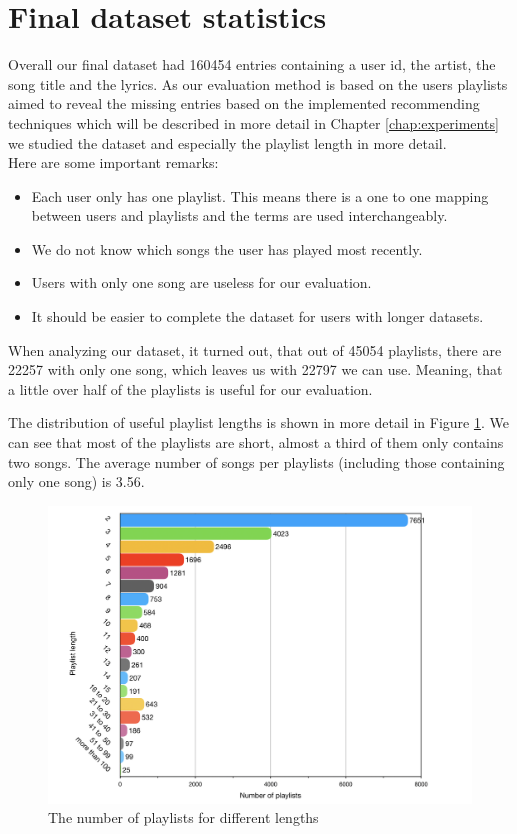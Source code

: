 \section{Final dataset statistics}
Overall our final dataset had 160454 entries containing a user id, the artist, the song title and the lyrics. As our evaluation method is based on the users playlists  aimed to reveal the missing entries based on the implemented recommending techniques which will be described in more detail in Chapter \ref{chap:experiments} we studied the dataset and especially the playlist length in more detail.\\
Here are some important remarks:
\begin{itemize}
    \item Each user only has one playlist. This means there is a one to one mapping between users and playlists and the terms are used interchangeably.
    \item We do not know which songs the user has played most recently.
    \item Users with only one song are useless for our evaluation.
    \item It should be easier to complete the dataset for users with longer datasets.
\end{itemize} 
When analyzing our dataset, it turned out, that out of 45054 playlists, there are 22257 with only one song, which leaves us with 22797 we can use. Meaning, that a little over half of the playlists is useful for our evaluation.

The distribution of useful playlist lengths is shown in more detail in Figure \ref{fig:playlist_length_distribution}. We can see that most of the playlists are short, almost a third of them only contains two songs. The average number of songs per playlists (including those containing only one song) is 3.56. 
\begin{figure}[ht]
    \centering
	\includegraphics[width=1\linewidth]{./img/playlist_length_numbers.png}
	\caption{The number of playlists for different lengths}
	\label{fig:playlist_length_distribution}
\end{figure}

